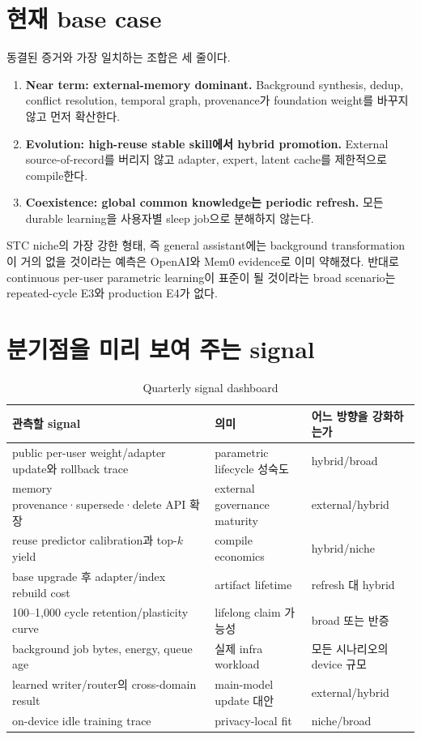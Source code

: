 \section{현재 base case}

동결된 증거와 가장 일치하는 조합은 세 줄이다.

\begin{enumerate}
  \item \textbf{Near term: external-memory dominant.} Background synthesis, dedup, conflict resolution,
  temporal graph, provenance가 foundation weight를 바꾸지 않고 먼저 확산한다.
  \item \textbf{Evolution: high-reuse stable skill에서 hybrid promotion.} External source-of-record를
  버리지 않고 adapter, expert, latent cache를 제한적으로 compile한다.
  \item \textbf{Coexistence: global common knowledge는 periodic refresh.} 모든 durable learning을
  사용자별 sleep job으로 분해하지 않는다.
\end{enumerate}

STC niche의 가장 강한 형태, 즉 general assistant에는 background transformation이 거의 없을 것이라는
예측은 OpenAI와 Mem0 evidence로 이미 약해졌다. 반대로 continuous per-user parametric learning이
표준이 될 것이라는 broad scenario는 repeated-cycle E3와 production E4가 없다.

\section{분기점을 미리 보여 주는 signal}

\begin{table}[htbp]
\centering
\caption{Quarterly signal dashboard}
\label{tab:scenario-signals}
\begin{tabularx}{\textwidth}{L{0.32\textwidth} Y L{0.25\textwidth}}
\toprule
관측할 signal & 의미 & 어느 방향을 강화하는가 \\
\midrule
public per-user weight/adapter update와 rollback trace & parametric lifecycle 성숙도 & hybrid/broad \\
memory provenance·supersede·delete API 확장 & external governance maturity & external/hybrid \\
reuse predictor calibration과 top-$k$ yield & compile economics & hybrid/niche \\
base upgrade 후 adapter/index rebuild cost & artifact lifetime & refresh 대 hybrid \\
100--1,000 cycle retention/plasticity curve & lifelong claim 가능성 & broad 또는 반증 \\
background job bytes, energy, queue age & 실제 infra workload & 모든 시나리오의 device 규모 \\
learned writer/router의 cross-domain result & main-model update 대안 & external/hybrid \\
on-device idle training trace & privacy-local fit & niche/broad \\
\bottomrule
\end{tabularx}
\end{table}


